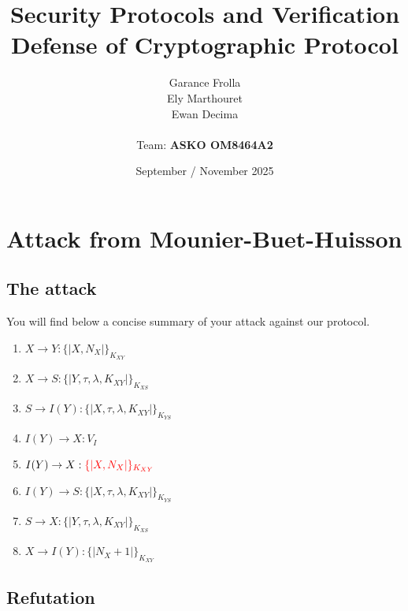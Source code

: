 \documentclass[11pt]{article}
\begin{document}
    \title{
            { \textbf{Security Protocols and Verification}} \\[1ex]
        {\small Defense of Cryptographic Protocol}
    }


    \author{
        Garance Frolla \\
        Ely Marthouret \\
        Ewan Decima\\ \\
        Team: \textbf{ASKO OM8464A2}
    }

    \date{September / November 2025}


    \maketitle
    \tableofcontents
    \newpage

    \section{Attack from Mounier-Buet-Huisson}

    \subsection{The attack}
    You will find below a concise summary of your attack against our protocol.

    \begin{enumerate}
        \item $X \rightarrow Y: \{|X, N_X|\}_{K_{XY}}$
        \item $X \rightarrow S : \{| Y, \tau, \lambda, K_{XY}|\}_{K_{XS}}$
        \item $S \rightarrow I(Y): \{|X, \tau, \lambda, K_{XY}|\}_{K_{YS}}$
        \item $I(Y) \rightarrow X: V_I$
        \item $I(Y) \rightarrow X: \textcolor{red}{\{|X, N_X|\}_{K_{XY}}}$
        \item $I(Y) \rightarrow S: \{|X, \tau, \lambda, K_{XY} |\}_{K_{YS}}$
        \item $S \rightarrow X : \{| Y, \tau, \lambda, K_{XY}|\}_{K_{XS}}$
        \item $X \rightarrow I(Y) : \{|N_X + 1|\}_{K_{XY}}$

    \end{enumerate}
    \subsection{Refutation}
\end{document}
